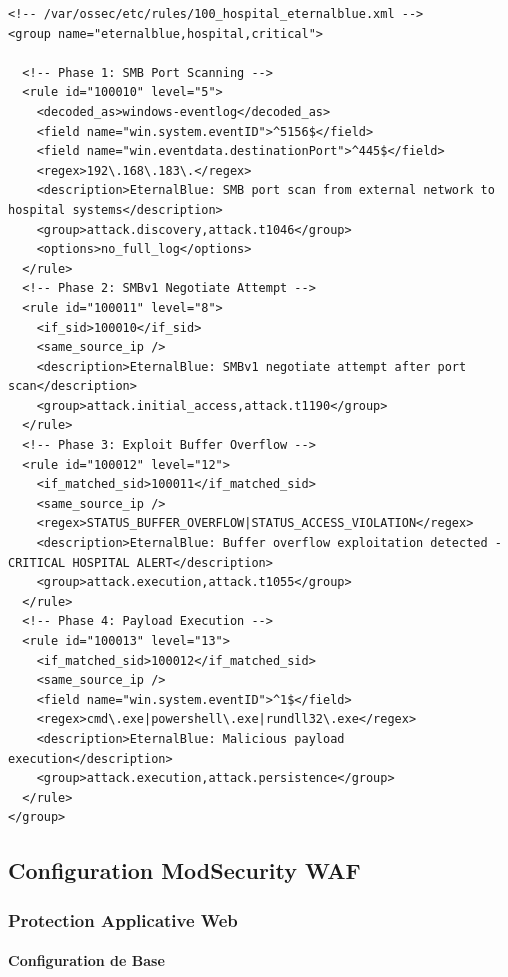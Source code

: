 \begin{lstlisting}[style=xmlstyle,caption=Regles EternalBlue specialisees pour environnement hospitalier]
<!-- /var/ossec/etc/rules/100_hospital_eternalblue.xml -->
<group name="eternalblue,hospital,critical">
  
  <!-- Phase 1: SMB Port Scanning -->
  <rule id="100010" level="5">
    <decoded_as>windows-eventlog</decoded_as>
    <field name="win.system.eventID">^5156$</field>
    <field name="win.eventdata.destinationPort">^445$</field>
    <regex>192\.168\.183\.</regex>
    <description>EternalBlue: SMB port scan from external network to hospital systems</description>
    <group>attack.discovery,attack.t1046</group>
    <options>no_full_log</options>
  </rule>
  <!-- Phase 2: SMBv1 Negotiate Attempt -->
  <rule id="100011" level="8">
    <if_sid>100010</if_sid>
    <same_source_ip />
    <description>EternalBlue: SMBv1 negotiate attempt after port scan</description>
    <group>attack.initial_access,attack.t1190</group>
  </rule>
  <!-- Phase 3: Exploit Buffer Overflow -->
  <rule id="100012" level="12">
    <if_matched_sid>100011</if_matched_sid>
    <same_source_ip />
    <regex>STATUS_BUFFER_OVERFLOW|STATUS_ACCESS_VIOLATION</regex>
    <description>EternalBlue: Buffer overflow exploitation detected - CRITICAL HOSPITAL ALERT</description>
    <group>attack.execution,attack.t1055</group>
  </rule>
  <!-- Phase 4: Payload Execution -->
  <rule id="100013" level="13">
    <if_matched_sid>100012</if_matched_sid>
    <same_source_ip />
    <field name="win.system.eventID">^1$</field>
    <regex>cmd\.exe|powershell\.exe|rundll32\.exe</regex>
    <description>EternalBlue: Malicious payload execution</description>
    <group>attack.execution,attack.persistence</group>
  </rule>
</group>
\end{lstlisting}


\subsection{Configuration ModSecurity WAF}

\subsubsection{Protection Applicative Web}

\paragraph{Configuration de Base}

